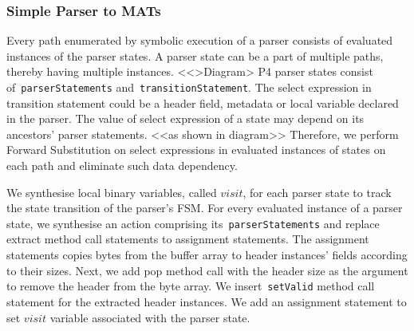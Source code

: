 \subsubsection{Simple Parser to MATs}
\label{subsubsection:simple-parser-to-mats}
Every path enumerated by symbolic execution of a parser consists of evaluated instances of the parser states.
A parser state can be a part of multiple paths, thereby having multiple instances.
<<>Diagram>
P4 parser states consist of~\texttt{parser\-Statements} and~\texttt{transition\-Statement}.
The select expression in transition statement could be a header field, metadata or local variable declared in the parser.
The value of select expression of a state may depend on its ancestors' parser statements. <<as shown in diagram>>
Therefore, we perform Forward Substitution on select expressions in evaluated instances of states
on each path and eliminate such data dependency.

We synthesise local binary variables, called $visit$, for each parser state to track the state transition of the parser's FSM.
For every evaluated instance of a parser state, we synthesise an action comprising its~\texttt{parser\-Statements} and replace extract method call statements to assignment statements.
The assignment statements copies bytes from the buffer array to header instances' fields according to their sizes.
Next, we add pop method call with the header size as the argument to remove the header from the byte array.
We insert~\texttt{setValid} method call statement for the extracted header instances.
We add an assignment statement to set $visit$ variable associated with the parser state.

